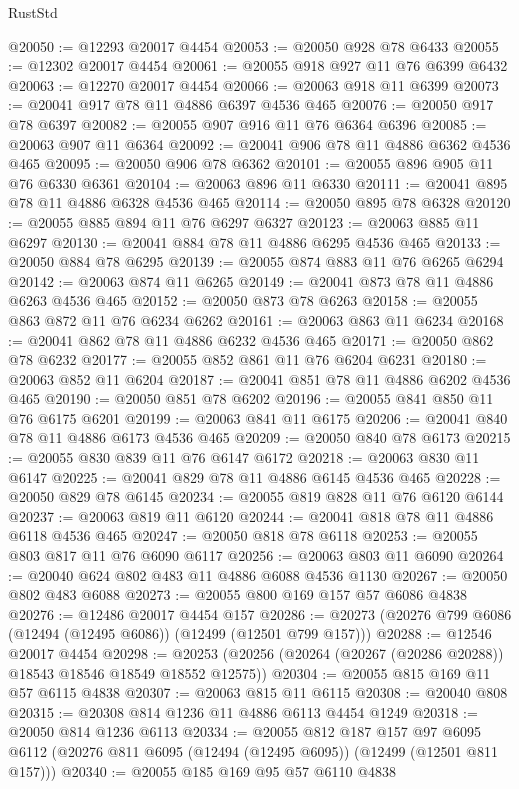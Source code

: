 \begin{lexlean}{RustStd}
\begin{coremodule}
{\begin{coremodule}
{{{{{{{{{{{{{{{{{{{{{{{{{{{{{{{{{{{{{{{{{{{{{{{{{{{{{{{{{{{{{{{{{{{{{{{{{{{{{{{{@20050 := @12293 @20017 @4454
@20053 := @20050 @928 @78 @6433
@20055 := @12302 @20017 @4454
@20061 := @20055 @918 @927 @11 @76 @6399 @6432
@20063 := @12270 @20017 @4454
@20066 := @20063 @918 @11 @6399
@20073 := @20041 @917 @78 @11 @4886 @6397 @4536 @465
@20076 := @20050 @917 @78 @6397
@20082 := @20055 @907 @916 @11 @76 @6364 @6396
@20085 := @20063 @907 @11 @6364
@20092 := @20041 @906 @78 @11 @4886 @6362 @4536 @465
@20095 := @20050 @906 @78 @6362
@20101 := @20055 @896 @905 @11 @76 @6330 @6361
@20104 := @20063 @896 @11 @6330
@20111 := @20041 @895 @78 @11 @4886 @6328 @4536 @465
@20114 := @20050 @895 @78 @6328
@20120 := @20055 @885 @894 @11 @76 @6297 @6327
@20123 := @20063 @885 @11 @6297
@20130 := @20041 @884 @78 @11 @4886 @6295 @4536 @465
@20133 := @20050 @884 @78 @6295
@20139 := @20055 @874 @883 @11 @76 @6265 @6294
@20142 := @20063 @874 @11 @6265
@20149 := @20041 @873 @78 @11 @4886 @6263 @4536 @465
@20152 := @20050 @873 @78 @6263
@20158 := @20055 @863 @872 @11 @76 @6234 @6262
@20161 := @20063 @863 @11 @6234
@20168 := @20041 @862 @78 @11 @4886 @6232 @4536 @465
@20171 := @20050 @862 @78 @6232
@20177 := @20055 @852 @861 @11 @76 @6204 @6231
@20180 := @20063 @852 @11 @6204
@20187 := @20041 @851 @78 @11 @4886 @6202 @4536 @465
@20190 := @20050 @851 @78 @6202
@20196 := @20055 @841 @850 @11 @76 @6175 @6201
@20199 := @20063 @841 @11 @6175
@20206 := @20041 @840 @78 @11 @4886 @6173 @4536 @465
@20209 := @20050 @840 @78 @6173
@20215 := @20055 @830 @839 @11 @76 @6147 @6172
@20218 := @20063 @830 @11 @6147
@20225 := @20041 @829 @78 @11 @4886 @6145 @4536 @465
@20228 := @20050 @829 @78 @6145
@20234 := @20055 @819 @828 @11 @76 @6120 @6144
@20237 := @20063 @819 @11 @6120
@20244 := @20041 @818 @78 @11 @4886 @6118 @4536 @465
@20247 := @20050 @818 @78 @6118
@20253 := @20055 @803 @817 @11 @76 @6090 @6117
@20256 := @20063 @803 @11 @6090
@20264 := @20040 @624 @802 @483 @11 @4886 @6088 @4536 @1130
@20267 := @20050 @802 @483 @6088
@20273 := @20055 @800 @169 @157 @57 @6086 @4838
@20276 := @12486 @20017 @4454 @157
@20286 := @20273 (@20276 @799 @6086 (@12494 (@12495 @6086)) (@12499 (@12501 @799 @157)))
@20288 := @12546 @20017 @4454
@20298 := @20253 (@20256 (@20264 (@20267 (@20286 @20288)) @18543 @18546 @18549 @18552 @12575))
@20304 := @20055 @815 @169 @11 @57 @6115 @4838
@20307 := @20063 @815 @11 @6115
@20308 := @20040 @808
@20315 := @20308 @814 @1236 @11 @4886 @6113 @4454 @1249
@20318 := @20050 @814 @1236 @6113
@20334 := @20055
    @812
    @187
    @157
    @97
    @6095
    @6112
    (@20276 @811 @6095 (@12494 (@12495 @6095)) (@12499 (@12501 @811 @157)))
@20340 := @20055 @185 @169 @95 @57 @6110 @4838
}}}}}}}}}}}}}}}}}}}}}}}}}}}}}}}}}}}}}}}}}}}}}}}}}}}}}}}}}}}}}}}}}}}}}}}}}}}}}}}}
\end{coremodule}}
\end{coremodule}
\end{lexlean}
